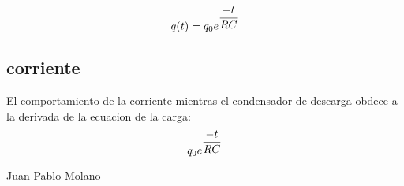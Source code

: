 \documentclass[12pt]{article}
\begin{document}
\begin{equation}
q(t) = q_0e^{\dfrac{-t}{RC}}$$
$$\end{equation}

\subsection{corriente}

El comportamiento de la corriente mientras el condensador de descarga obdece a la derivada de la ecuacion de la carga:\\

\begin{equation} 
q_0e^{\dfrac{-t}{RC}}$$
 
$$\end{equation}

\begin{Huge}
 Juan Pablo Molano

\end{Huge}
\end{document}
